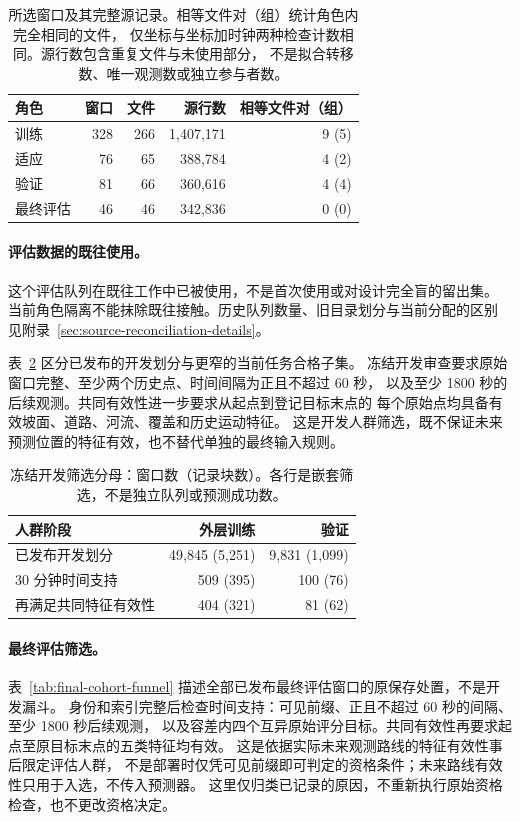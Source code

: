 \documentclass[UTF8,11pt]{ctexart}
\begin{document}
\begin{table}[htbp]
\centering\small
\caption{所选窗口及其完整源记录。相等文件对（组）统计角色内完全相同的文件，
仅坐标与坐标加时钟两种检查计数相同。源行数包含重复文件与未使用部分，
不是拟合转移数、唯一观测数或独立参与者数。}
\label{tab:source-sequence-screen}
\begin{tabular}{@{}lrrrr@{}}
\toprule
角色 & 窗口 & 文件 & 源行数 & 相等文件对（组）\\
\midrule
训练 & 328 & 266 & 1,407,171 & 9 (5)\\
适应 & 76 & 65 & 388,784 & 4 (2)\\
验证 & 81 & 66 & 360,616 & 4 (4)\\
最终评估 & 46 & 46 & 342,836 & 0 (0)\\
\bottomrule
\end{tabular}
\end{table}

\paragraph{评估数据的既往使用。}
这个评估队列在既往工作中已被使用，不是首次使用或对设计完全盲的留出集。
当前角色隔离不能抹除既往接触。历史队列数量、旧目录划分与当前分配的区别
见附录~\ref{sec:source-reconciliation-details}。

表~\ref{tab:cohort-denominators} 区分已发布的开发划分与更窄的当前任务合格子集。
冻结开发审查要求原始窗口完整、至少两个历史点、时间间隔为正且不超过 60 秒，
以及至少 1800 秒的后续观测。共同有效性进一步要求从起点到登记目标末点的
每个原始点均具备有效坡面、道路、河流、覆盖和历史运动特征。
这是开发人群筛选，既不保证未来预测位置的特征有效，也不替代单独的最终输入规则。

\begin{table}[htbp]
\centering\small
\caption{冻结开发筛选分母：窗口数（记录块数）。各行是嵌套筛选，不是独立队列或预测成功数。}
\label{tab:cohort-denominators}
\begin{tabular}{@{}p{.46\linewidth}rr@{}}
\toprule
人群阶段 & 外层训练 & 验证\\
\midrule
已发布开发划分 & 49,845 (5,251) & 9,831 (1,099)\\
30 分钟时间支持 & 509 (395) & 100 (76)\\
再满足共同特征有效性 & 404 (321) & 81 (62)\\
\bottomrule
\end{tabular}
\end{table}

\paragraph{最终评估筛选。}\label{sec:final-cohort-funnel}
表~\ref{tab:final-cohort-funnel} 描述全部已发布最终评估窗口的原保存处置，不是开发漏斗。
身份和索引完整后检查时间支持：可见前缀、正且不超过 60 秒的间隔、至少 1800 秒后续观测，
以及容差内四个互异原始评分目标。共同有效性再要求起点至原目标末点的五类特征均有效。
这是依据实际未来观测路线的特征有效性事后限定评估人群，
不是部署时仅凭可见前缀即可判定的资格条件；未来路线有效性只用于入选，不传入预测器。
这里仅归类已记录的原因，不重新执行原始资格检查，也不更改资格决定。
\end{document}
